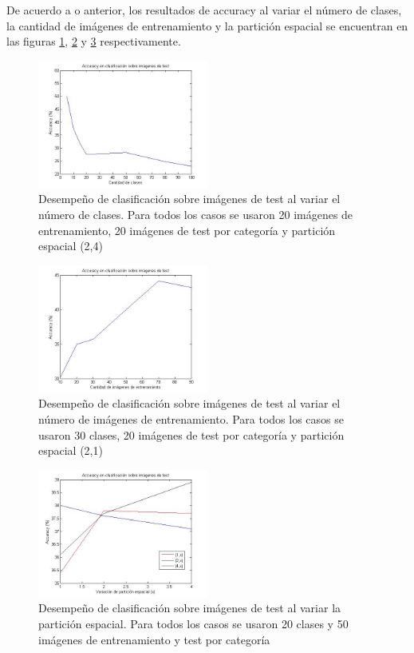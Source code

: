 \documentclass[10pt,twocolumn,letterpaper]{article}
\begin{document}
De acuerdo a o anterior, los resultados de accuracy al variar el número de clases, la cantidad de imágenes de entrenamiento y la partición espacial se encuentran en las figuras \ref{fig:clases}, \ref{fig:train} y \ref{fig:particion} respectivamente.

\begin{figure}[h]
    \centering
    \includegraphics[width=0.5\textwidth]{VariacionNumClases.jpg}
    \caption{Desempeño de clasificación sobre imágenes de test al variar el número de clases. Para todos los casos se usaron 20 imágenes de entrenamiento, 20 imágenes de test por categoría y partición espacial (2,4)}
    \label{fig:clases}
\end{figure}

\begin{figure}[h]
    \centering
    \includegraphics[width=0.5\textwidth]{VariacionNumTrain.jpg}
    \caption{Desempeño de clasificación sobre imágenes de test al variar el número de imágenes de entrenamiento. Para todos los casos se usaron 30 clases, 20 imágenes de test por categoría y partición espacial (2,1)}
    \label{fig:train}
\end{figure}

\begin{figure}[h]
    \centering
    \includegraphics[width=0.5\textwidth]{VariacionNumSpatialX.jpg}
    \caption{Desempeño de clasificación sobre imágenes de test al variar la partición espacial. Para todos los casos se usaron 20 clases y 50 imágenes de entrenamiento y test por categoría}
    \label{fig:particion}
\end{figure}
\end{document}
